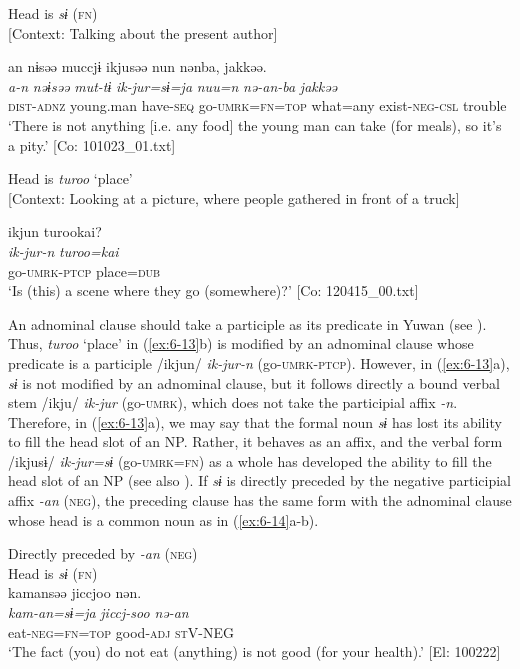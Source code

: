 \ea\label{ex:6-13}
\ea Head is \textit{sɨ} (\textsc{fn})\\{}
[Context: Talking about the present author]

{\TM}
\glll an  nɨsəə  muccjɨ  ikjusəə  nun  nənba,  jakkəə.\\
\textit{a-n}  \textit{nəɨsəə}  \textit{mut-tɨ}  \textit{ik-jur=sɨ=ja}  \textit{nuu=n}   \textit{nə-an-ba}  \textit{jakkəə}\\
    \textsc{dist}-\textsc{adnz}  young.man  have-\textsc{seq}  go-\textsc{umrk}=\textsc{fn}=\textsc{top}  what=any    exist-\textsc{neg}-\textsc{csl}  trouble\\
\glt    ‘There is not anything [i.e. any food] the young man can take (for meals), so it’s a pity.’ [Co: 101023\_01.txt]
\z

\ex Head is \textit{turoo} ‘place’\\{}
  [Context: Looking at a picture, where people gathered in front of a truck]

{\TM}
\glll ikjun  turookai?\\
\textit{ik-jur-n}  \textit{turoo=kai}\\
    go-\textsc{umrk}-\textsc{ptcp}  place=\textsc{dub}\\
\glt    ‘Is (this) a scene where they go (somewhere)?’ [Co: 120415\_00.txt]
\z

An adnominal clause should take a participle as its predicate in Yuwan (see ). Thus, \textit{turoo} ‘place’ in (\ref{ex:6-13}b) is modified by an adnominal clause whose predicate is a participle /ikjun/ \textit{ik-jur-n} (go-\textsc{umrk}-\textsc{ptcp}). However, in (\ref{ex:6-13}a), \textit{sɨ} is not modified by an adnominal clause, but it follows directly a bound verbal stem /ikju/ \textit{ik-jur} (go-\textsc{umrk}), which does not take the participial affix \textit{-n}. Therefore, in (\ref{ex:6-13}a), we may say that the formal noun \textit{sɨ} has lost its ability to fill the head slot of an NP. Rather, it behaves as an affix, and the verbal form /ikjusɨ/ \textit{ik-jur=sɨ} (go-\textsc{umrk}=\textsc{fn}) as a whole has developed the ability to fill the head slot of an NP (see also ). If \textit{sɨ} is directly preceded by the negative participial affix \textit{-an} (\textsc{neg}), the preceding clause has the same form with the adnominal clause whose head is a common noun as in (\ref{ex:6-14}a-b).

\ea\label{ex:6-14}
 Directly preceded by \textit{-an} (\textsc{neg})\\
 \ea Head is \textit{sɨ} (\textsc{fn})\\
{\TM}
\glll  kamansəə  jiccjoo  nən.\\
\textit{kam-an=sɨ=ja}  \textit{jiccj-soo}  \textit{nə-an}\\
eat-\textsc{neg}=\textsc{fn}=\textsc{top}  good-\textsc{adj}  \textsc{st}V-NEG\\
\glt ‘The fact (you) do not eat (anything) is not good (for your health).’ [El: 100222]


